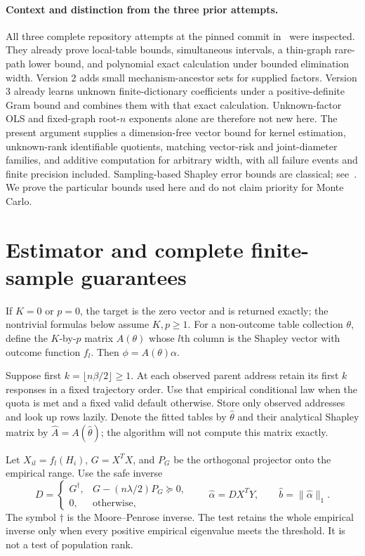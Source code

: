 \documentclass[11pt,a4paper]{article}
\numberwithin{equation}{section}
\theoremstyle{definition}
\begin{document}
\paragraph{Context and distinction from the three prior attempts.}
All three complete repository attempts at the pinned commit in~\cite{prior}
were inspected. They already prove local-table bounds, simultaneous
intervals, a thin-graph rare-path lower bound, and polynomial exact
calculation under bounded elimination width. Version 2 adds small
mechanism-ancestor sets for supplied factors. Version 3 already learns
unknown finite-dictionary coefficients under a positive-definite Gram
bound and combines them with that exact calculation. Unknown-factor OLS
and fixed-graph root-$n$ exponents alone are therefore not new here.
The present argument supplies a dimension-free vector bound for kernel
estimation, unknown-rank identifiable quotients, matching vector-risk and
joint-diameter families, and additive computation for arbitrary width,
with all failure events and finite precision included. Sampling-based
Shapley error bounds are classical; see~\cite{sampling}. We prove the
particular bounds used here and do not claim priority for Monte Carlo.

\section{Estimator and complete finite-sample guarantees}\label{sec:main}

If $K=0$ or $p=0$, the target is the zero vector and is returned exactly;
the nontrivial formulas below assume $K,p\ge1$.
For a non-outcome table collection $\theta$, define the $K$-by-$p$ matrix
$A(\theta)$ whose $l$th column is the Shapley vector with outcome function
$f_l$. Then $\phi=A(\theta)\alpha$.

Suppose first $k=\lfloor n\beta/2\rfloor\ge1$. At each observed parent
address retain its first $k$ responses in a fixed trajectory order.
Use that empirical conditional law when the quota is met and a fixed
valid default otherwise. Store only observed addresses and look up rows
lazily. Denote the fitted tables by $\widehat\theta$ and their analytical
Shapley matrix by $\widehat A=A(\widehat\theta)$; the algorithm will not
compute this matrix exactly.

Let $X_{il}=f_l(H_i)$, $G=X^T X$, and $P_G$ be the orthogonal projector
onto the empirical range. Use the safe inverse
\begin{equation}\label{eq:estimator}
 D=\begin{cases}G^\dagger,&G-(n\lambda/2)P_G\succeq0,\\
 0,&\text{otherwise},\end{cases}
 \qquad \widehat\alpha=DX^T Y,
 \qquad \widehat b=\|\widehat\alpha\|_1.
\end{equation}
The symbol $\dagger$ is the Moore--Penrose inverse. The test retains the
whole empirical inverse only when every positive empirical eigenvalue
meets the threshold. It is not a test of population rank.
\end{document}
